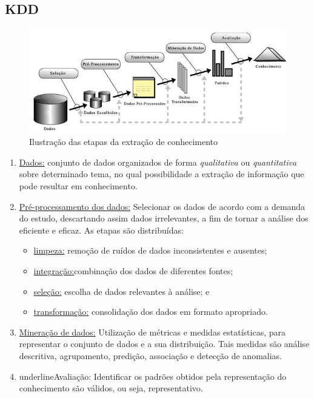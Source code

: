 \subsection*{KDD}

\begin{figure}[!htp]
	\centering
	\includegraphics[scale=.65]{../img/kdd/pt.png}
	\caption{Ilustração das etapas da extração de conhecimento}
	\label{img:kdd}
\end{figure}

\begin{enumerate}
	\item \underline{Dados:}
	      conjunto de dados organizados de forma \textit{qualitativa} ou \textit{quantitativa} sobre determinado tema, no qual possibilidade a extração de informação que pode resultar em conhecimento.
	\item \underline{Pré-processamento dos dados:}
	      Selecionar os dados de acordo com a demanda do estudo, descartando assim dados irrelevantes, a fim de tornar a análise dos eficiente e eficaz.
	      As etapas são distribuídas:
	      \begin{itemize}
		      \item \underline{limpeza:} remoção de ruídos de dados inconsistentes e ausentes;
		      \item \underline{integração:}combinação dos dados de diferentes fontes;
		      \item \underline{seleção:} escolha de dados relevantes à análise; e
		      \item \underline{transformação:} consolidação dos dados em formato apropriado.
	      \end{itemize}
	\item \underline{Mineração de dados:}
	      Utilização de métricas e medidas estatísticas, para representar o conjunto de dados e a sua distribuição.
	      Tais medidas são análise descritiva, agrupamento, predição, associação e detecção de anomalias.
	\item underline{Avaliação:}
	      Identificar os padrões obtidos pela representação do conhecimento são válidos, ou seja, representativo.
\end{enumerate}
